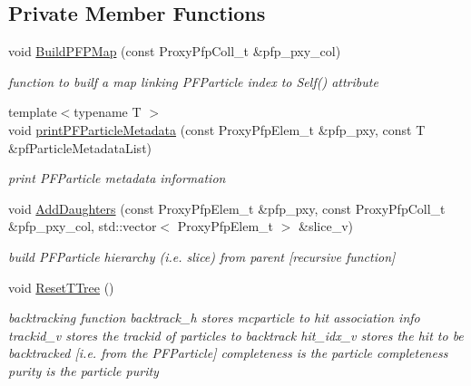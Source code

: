 \subsection*{Private Member Functions}
\begin{DoxyCompactItemize}
\item 
void \hyperlink{classNeutrinoSelectionFilter_a6197e3f1a358b67d7ef2e5a68f0713e9}{Build\-P\-F\-P\-Map} (const Proxy\-Pfp\-Coll\-\_\-t \&pfp\-\_\-pxy\-\_\-col)
\begin{DoxyCompactList}\small\item\em function to builf a map linking P\-F\-Particle index to Self() attribute \end{DoxyCompactList}\item 
\hypertarget{classNeutrinoSelectionFilter_a15d4d438104af0465749ea02a2dfabfd}{{\footnotesize template$<$typename T $>$ }\\void \hyperlink{classNeutrinoSelectionFilter_a15d4d438104af0465749ea02a2dfabfd}{print\-P\-F\-Particle\-Metadata} (const Proxy\-Pfp\-Elem\-\_\-t \&pfp\-\_\-pxy, const T \&pf\-Particle\-Metadata\-List)}\label{classNeutrinoSelectionFilter_a15d4d438104af0465749ea02a2dfabfd}

\begin{DoxyCompactList}\small\item\em print P\-F\-Particle metadata information \end{DoxyCompactList}\item 
void \hyperlink{classNeutrinoSelectionFilter_a7b59a7f8e5f49bddb677833b4e30e136}{Add\-Daughters} (const Proxy\-Pfp\-Elem\-\_\-t \&pfp\-\_\-pxy, const Proxy\-Pfp\-Coll\-\_\-t \&pfp\-\_\-pxy\-\_\-col, std\-::vector$<$ Proxy\-Pfp\-Elem\-\_\-t $>$ \&slice\-\_\-v)
\begin{DoxyCompactList}\small\item\em build P\-F\-Particle hierarchy (i.\-e. slice) from parent \mbox{[}recursive function\mbox{]} \end{DoxyCompactList}\item 
void \hyperlink{classNeutrinoSelectionFilter_a530acd378dad32bbb0bb9c05ef0a9343}{Reset\-T\-Tree} ()
\begin{DoxyCompactList}\small\item\em backtracking function backtrack\-\_\-h stores mcparticle to hit association info trackid\-\_\-v stores the trackid of particles to backtrack hit\-\_\-idx\-\_\-v stores the hit to be backtracked \mbox{[}i.\-e. from the P\-F\-Particle\mbox{]} completeness is the particle completeness purity is the particle purity \end{DoxyCompactList}\end{DoxyCompactItemize}
